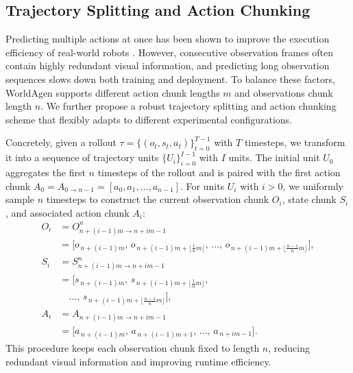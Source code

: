 \subsection{Trajectory Splitting and Action Chunking}
\label{traj_split}
Predicting multiple actions at once has been shown to
improve the execution efficiency of real-world robots \cite{intelligence2025pi_}. However, consecutive
observation frames often contain highly redundant visual information, and predicting long observation sequences slows down both training and deployment. To balance these factors, WorldAgen supports different action chunk lengths $m$ and observations chunk length $n$.
We further propose a robust trajectory splitting and action chunking scheme that flexibly adapts to different experimental configurations.

Concretely, given a rollout $\tau = \{(o_t, s_t, a_t)\}_{t=0}^{T-1}$ with $T$ timesteps, we
transform it into a sequence of trajectory units $\{U_i\}_{i=0}^{I-1}$ with $I$ units.
The initial unit $U_0$ aggregates the first $n$ timesteps of the rollout and is paired
with the first action chunk $A_0 = A_{0 \rightarrow n-1} = [a_0, a_1, \ldots, a_{n-1}]$.
For units $U_i$ with $i>0$, we uniformly sample $n$ timesteps to construct the current
observation chunk $O_i$, state chunk $S_i$, and associated action chunk $A_i$:
\begin{align*}
O_i &= O^{n}_{n+(i-1)m \rightarrow n+im-1} \\
    &= \big[
             o_{\,n+(i-1)m},\,
             o_{\,n+(i-1)m + \lfloor \tfrac{1}{n} m \rfloor},\,
             \ldots,\,
             o_{\,n+(i-1)m + \lfloor \tfrac{n-1}{n} m \rfloor}
       \big], \\
S_i &= S^{n}_{n+(i-1)m \rightarrow n+im-1} \\
    &= \big[
          s_{\,n+(i-1)m},\,
          s_{\,n+(i-1)m + \big\lfloor \tfrac{1}{n} m \big\rfloor},\,
\\
    &\quad
          \ldots,\,
          s_{\,n+(i-1)m + \big\lfloor \tfrac{n-1}{n} m \big\rfloor}
       \big], \\
A_i &= A_{n+(i-1)m \rightarrow n+im-1} \\
    &= \big[
             a_{\,n+(i-1)m},\,
             a_{\,n+(i-1)m+1},\,
             \ldots,\,
             a_{\,n+im-1}
       \big].
\end{align*}
This procedure keeps each observation chunk fixed to length $n$, reducing redundant
visual information and improving runtime efficiency.


